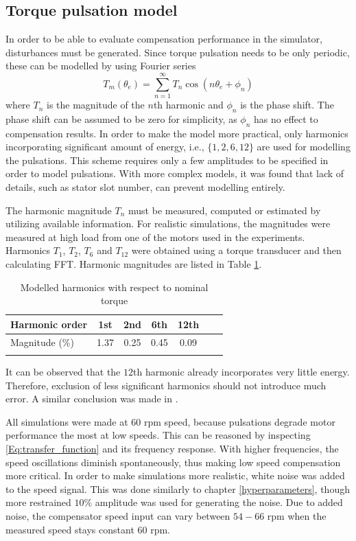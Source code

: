 \subsection{Torque pulsation model}
In order to be able to evaluate compensation performance in the simulator, disturbances must be generated. Since torque pulsation needs to be only periodic, these can be modelled by using Fourier series
\begin{equation}
    T_m(\theta_e) = \sum_{n=1}^{\infty} T_n \cos(n \theta_e + \phi_n)
    \label{pulsation_model2}
\end{equation}
where $T_n$ is the magnitude of the $n$th harmonic and $\phi_n$ is the phase shift. The phase shift can be assumed to be zero for simplicity, as $\phi_n$ has no effect to compensation results. In order to make the model more practical, only harmonics incorporating significant amount of energy, i.e., $\{ 1, 2, 6, 12\}$ are used for modelling the pulsations. This scheme requires only a few amplitudes to be specified in order to model pulsations. With more complex models, it was found that lack of details, such as stator slot number, can prevent modelling entirely.

The harmonic magnitude $T_n$ must be measured, computed or estimated by utilizing available information. For realistic simulations, the magnitudes were measured at high load from one of the motors used in the experiments. Harmonics $T_1$, $T_2$, $T_6$ and $T_{12}$ were obtained using a torque transducer and then calculating FFT. Harmonic magnitudes are listed in Table \ref{Harmonics}.
\begin{table}[tb]
\caption{Modelled harmonics with respect to nominal torque}
\centering
\begin{tabular}[t]{lcccccc}
\hline
Harmonic order   & 1st & 2nd & 6th & 12th \\
\hline
Magnitude (\%)   & \num{1.37} & \num{0.25} & \num{0.45} & \num{0.09} \\
\hline
\label{Harmonics}
\end{tabular}
\end{table}%
It can be observed that the $12$th harmonic already incorporates very little energy. Therefore, exclusion of less significant harmonics should not introduce much error. A similar conclusion was made in \cite{CTR_SW:1998}.

All simulations were made at $60$ rpm speed, because pulsations degrade motor performance the most at low speeds. This can be reasoned by inspecting \eqref{Eq:transfer_function} and its frequency response. With higher frequencies, the speed oscillations diminish spontaneously, thus making low speed compensation more critical. In order to make simulations more realistic, white noise was added to the speed signal. This was done similarly to chapter \ref{hyperparameters}, though more restrained $10\%$ amplitude was used for generating the noise. Due to added noise, the compensator speed input can vary between $54-66$ rpm when the measured speed stays constant $60$ rpm.


